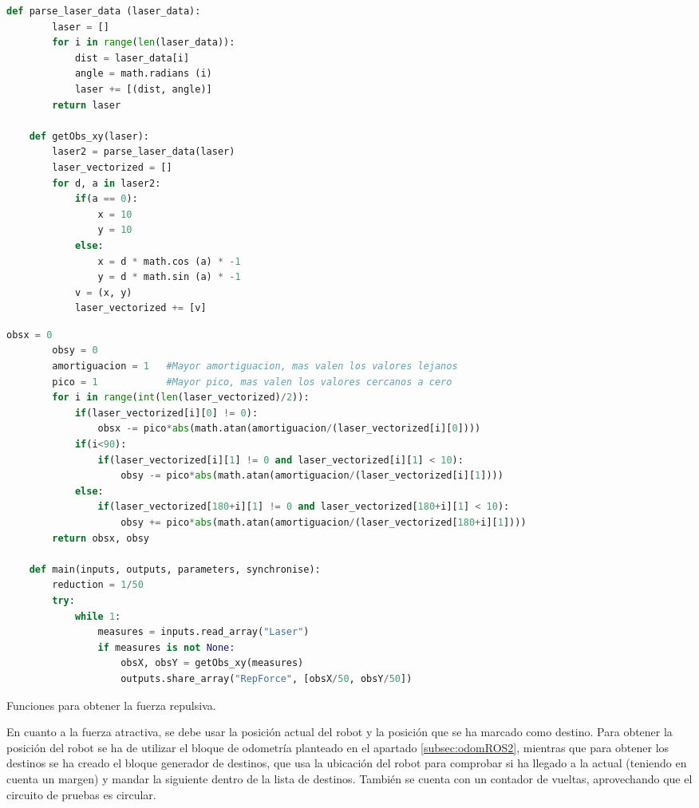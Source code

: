 \begin{code}[H]
    \begin{lstlisting}[language=python]
    def parse_laser_data (laser_data):
        laser = []
        for i in range(len(laser_data)):
            dist = laser_data[i]
            angle = math.radians (i)
            laser += [(dist, angle)]
        return laser
    
    def getObs_xy(laser):
        laser2 = parse_laser_data(laser)
        laser_vectorized = []
        for d, a in laser2:
            if(a == 0):
                x = 10
                y = 10
            else:
                x = d * math.cos (a) * -1
                y = d * math.sin (a) * -1
            v = (x, y)
            laser_vectorized += [v]
    \end{lstlisting}
\end{code}
\begin{code}[H]
    \begin{lstlisting}[language=python]
        obsx = 0
        obsy = 0    
        amortiguacion = 1   #Mayor amortiguacion, mas valen los valores lejanos
        pico = 1            #Mayor pico, mas valen los valores cercanos a cero
        for i in range(int(len(laser_vectorized)/2)):
            if(laser_vectorized[i][0] != 0):
                obsx -= pico*abs(math.atan(amortiguacion/(laser_vectorized[i][0])))
            if(i<90):
                if(laser_vectorized[i][1] != 0 and laser_vectorized[i][1] < 10):
                    obsy -= pico*abs(math.atan(amortiguacion/(laser_vectorized[i][1])))
            else:
                if(laser_vectorized[180+i][1] != 0 and laser_vectorized[180+i][1] < 10):
                    obsy += pico*abs(math.atan(amortiguacion/(laser_vectorized[180+i][1])))
        return obsx, obsy

    def main(inputs, outputs, parameters, synchronise):
        reduction = 1/50
        try:
            while 1:    
                measures = inputs.read_array("Laser")
                if measures is not None:
                    obsX, obsY = getObs_xy(measures)
                    outputs.share_array("RepForce", [obsX/50, obsY/50])
    \end{lstlisting}
    \caption[Funciones para obtener la fuerza repulsiva]{Funciones para obtener la fuerza repulsiva.}
    \label{cod:parse_laser_data}
\end{code}

En cuanto a la fuerza atractiva, se debe usar la posición actual del robot y la posición que se ha marcado como destino. Para obtener la
posición del robot se ha de utilizar el bloque de odometría planteado en el apartado \ref{subsec:odomROS2}, mientras que para obtener
los destinos se ha creado el bloque generador de destinos, que usa la ubicación del robot para comprobar si ha llegado a la
actual (teniendo en cuenta un margen) y mandar la siguiente dentro de la lista de destinos. También se cuenta con un contador
de vueltas, aprovechando que el circuito de pruebas es circular.

